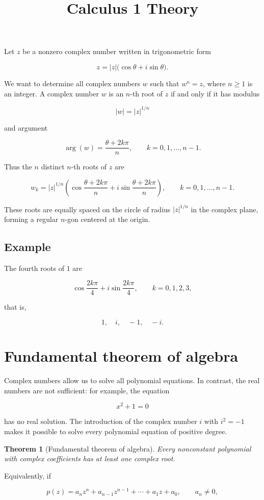 \documentclass[11pt,a4paper]{article} \usepackage[T1]{fontenc}
\theoremstyle{plain} \newtheorem{theorem}{Theorem} \title{Calculus 1 Theory}
\begin{document}
Let $z$ be a nonzero complex number written in trigonometric form

\[
z = |z|\bigl(\cos\theta + i\sin\theta\bigr).
\]

We want to determine all complex numbers $w$ such that $w^n = z$, where $n\ge
1$ is an integer. A complex number $w$ is an $n$-th root of $z$ if and only if
it has modulus

\[
|w| = |z|^{1/n}
\]

and argument

\[
\arg(w) = \frac{\theta + 2k\pi}{n}, \qquad k = 0,1,\ldots,n-1.
\]

Thus the $n$ distinct $n$-th roots of $z$ are

\[
w_k = |z|^{1/n}
\left(
\cos\frac{\theta + 2k\pi}{n}
+ i\sin\frac{\theta + 2k\pi}{n}
\right), \qquad k=0,1,\ldots,n-1.
\]

These roots are equally spaced on the circle of radius $|z|^{1/n}$ in the
complex plane, forming a regular $n$-gon centered at the origin.

\subsection*{Example}

The fourth roots of $1$ are

\[
\cos\frac{2k\pi}{4} + i\sin\frac{2k\pi}{4}, \qquad k=0,1,2,3,
\]

that is,

\[
1,\quad i,\quad -1,\quad -i.
\]

\section{Fundamental theorem of algebra}

Complex numbers allow us to solve all polynomial equations. In contrast, the
real numbers are not sufficient: for example, the equation

\[
x^2 + 1 = 0
\]

has no real solution. The introduction of the complex number $i$ with $i^2 =
-1$ makes it possible to solve every polynomial equation of positive degree.

\begin{theorem}
[Fundamental theorem of algebra] Every nonconstant polynomial with complex
coefficients has at least one complex root.
\end{theorem}

Equivalently, if

\[
p(z) = a_n z^n + a_{n-1} z^{n-1} + \cdots + a_1 z + a_0, \qquad a_n \neq 0,
\]
\end{document}
